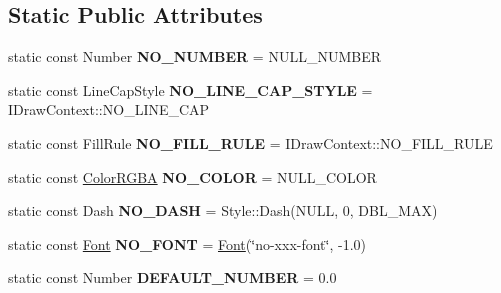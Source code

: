 \subsection*{Static Public Attributes}
\begin{DoxyCompactItemize}
\item 
\hypertarget{classsambag_1_1disco_1_1graphic_elements_1_1_style_aec14534505326b9a9c923fd715915c30}{
static const Number {\bfseries NO\_\-NUMBER} = NULL\_\-NUMBER}
\label{classsambag_1_1disco_1_1graphic_elements_1_1_style_aec14534505326b9a9c923fd715915c30}

\item 
\hypertarget{classsambag_1_1disco_1_1graphic_elements_1_1_style_a33c0725d93deb114028a7804a9fc57cd}{
static const LineCapStyle {\bfseries NO\_\-LINE\_\-CAP\_\-STYLE} = IDrawContext::NO\_\-LINE\_\-CAP}
\label{classsambag_1_1disco_1_1graphic_elements_1_1_style_a33c0725d93deb114028a7804a9fc57cd}

\item 
\hypertarget{classsambag_1_1disco_1_1graphic_elements_1_1_style_a6687438c368942595c27703c303d1497}{
static const FillRule {\bfseries NO\_\-FILL\_\-RULE} = IDrawContext::NO\_\-FILL\_\-RULE}
\label{classsambag_1_1disco_1_1graphic_elements_1_1_style_a6687438c368942595c27703c303d1497}

\item 
\hypertarget{classsambag_1_1disco_1_1graphic_elements_1_1_style_ad0185d259a7e0a53e64b48a84f38fc12}{
static const \hyperlink{structsambag_1_1com_1_1_color_r_g_b_a}{ColorRGBA} {\bfseries NO\_\-COLOR} = NULL\_\-COLOR}
\label{classsambag_1_1disco_1_1graphic_elements_1_1_style_ad0185d259a7e0a53e64b48a84f38fc12}

\item 
\hypertarget{classsambag_1_1disco_1_1graphic_elements_1_1_style_a0759f4b2dbd9b872614f043a5820417b}{
static const Dash {\bfseries NO\_\-DASH} = Style::Dash(NULL, 0, DBL\_\-MAX)}
\label{classsambag_1_1disco_1_1graphic_elements_1_1_style_a0759f4b2dbd9b872614f043a5820417b}

\item 
\hypertarget{classsambag_1_1disco_1_1graphic_elements_1_1_style_aba10a3a7c3b2c1b73cd661f1f9bc3399}{
static const \hyperlink{structsambag_1_1disco_1_1_font}{Font} {\bfseries NO\_\-FONT} = \hyperlink{structsambag_1_1disco_1_1_font}{Font}(\char`\"{}no-\/xxx-\/font\char`\"{}, -\/1.0)}
\label{classsambag_1_1disco_1_1graphic_elements_1_1_style_aba10a3a7c3b2c1b73cd661f1f9bc3399}

\item 
\hypertarget{classsambag_1_1disco_1_1graphic_elements_1_1_style_a0740472f83f0608b27b929b85692f04c}{
static const Number {\bfseries DEFAULT\_\-NUMBER} = 0.0}
\label{classsambag_1_1disco_1_1graphic_elements_1_1_style_a0740472f83f0608b27b929b85692f04c}


\end{DoxyCompactItemize}
